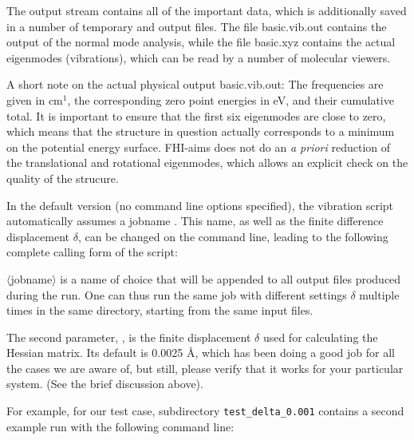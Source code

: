 The output stream contains all of the important data, which is
additionally saved in a number of temporary and output files. The file
basic.vib.out contains the output of the normal mode
analysis, while the file basic.xyz contains the actual eigenmodes
(vibrations), which can be read by a number of molecular viewers. 

A short note on the actual physical output basic.vib.out: The
frequencies are given in cm$^{1}$, the corresponding zero point
energies in eV, and their cumulative total. It is important to ensure
that the first six eigenmodes are close to zero, which means that the
structure in question actually corresponds to a minimum on the
potential energy surface. FHI-aims does not do an \emph{a priori}
reduction of the translational and rotational eigenmodes, which allows
an explicit check on the quality of the strucure.

In the default version (no command line options specified), the
vibration script automatically assumes a jobname . This
name, as well as the finite difference displacement $\delta$, can be
changed on the command line, leading to the following complete calling
form of the script:


$\langle$jobname$\rangle$ is a name of choice that will be
appended to all output files produced during the run. One can thus
run the same job with different settings $\delta$ multiple times in
the same directory, starting from the same input files.

The second parameter, , is the finite
displacement $\delta$ used for calculating the Hessian matrix. Its default is
0.0025 \AA, which has been doing a good job for all the cases we are
aware of, but still, please verify that it works for your particular
system. (See the brief discussion above). 

For example, for our test case, subdirectory
\texttt{test\_delta\_0.001} contains a second example run with the
following command line:


